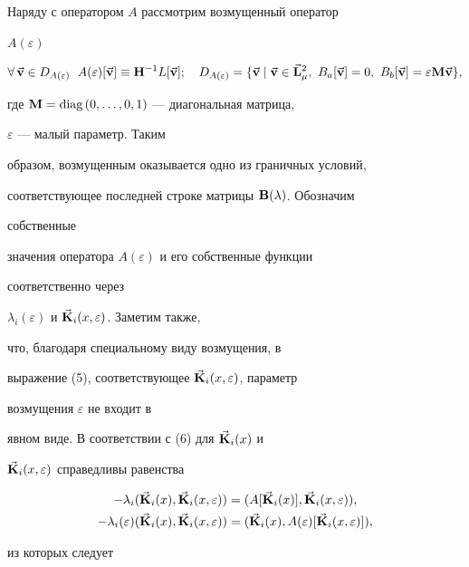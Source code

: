 \begin{pf} Наряду с оператором $A$ рассмотрим возмущенный оператор 


$A(\varepsilon)$ 


$$ 


\forall\,\vb{v}\in D_{A(\varepsilon)}\ \; A(\varepsilon) 


[\vb{v}]\equiv\bold H^{-1}L[\vb{v}];\quad 


D_{A(\varepsilon)}=\{\vb{v}\mid\vb{v}\in\vb{L}^2_\mu, 


\ B_a[\vb{v}]=0,\ B_b[\vb{v}]=\varepsilon\bold M\vb{v}\}, 


$$ 


где $\bold M=\text{diag\,}(0,\dotsc,0,1)$ --- диагональная матрица, 


$\varepsilon$ --- малый параметр. Таким 


образом, возмущенным оказывается одно из граничных условий, 


соответствующее последней строке матрицы $\bold B(\lambda)$. Обозначим 


собственные 


значения оператора $A(\varepsilon)$ и его собственные функции 


соответственно через 


$\lambda_i(\varepsilon)$ и $\Vec{\bold{K}}_i(x,\varepsilon)$. Заметим также, 


что, благодаря специальному виду возмущения, в 


выражение (5), соответствующее $\Vec{\bold{K}}_i(x,\varepsilon)$, параметр 


возмущения $\varepsilon$ не входит в 


явном виде. В соответствии с (6) для $\Vec{\bold{K}}_i(x)$ и 


$\Vec{\bold{K}}_i(x,\varepsilon)$ справедливы равенства 


\begin{align*} 


-\lambda_i(\vb{K}_i(x),\vb{K}_i(x,\varepsilon))&= 


(A[\vb{K}_i(x)],\vb{K}_i(x,\varepsilon)),\\ 


-\lambda_i(\varepsilon)(\vb{K}_i(x),\vb{K}_i(x,\varepsilon))&= 


(\vb{K}_i(x),A(\varepsilon)[\vb{K}_i(x,\varepsilon)]), 


\end{align*} 


из которых следует 


\begin{equation} 



\end{equation}
\end{pf}
